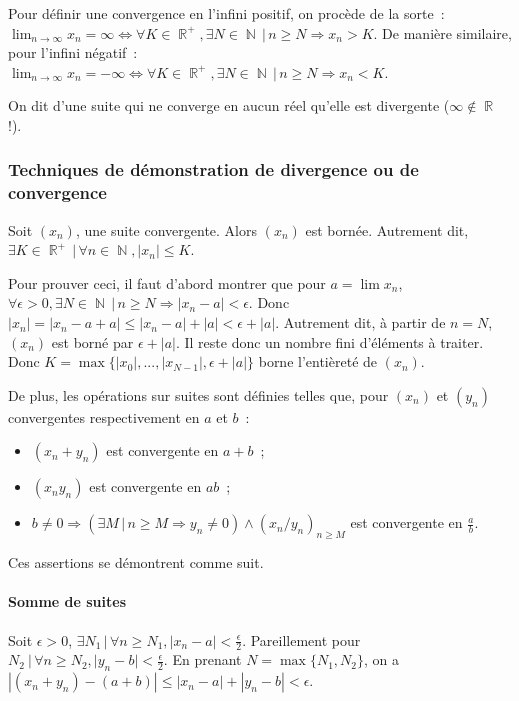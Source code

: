 \documentclass{article}
\DeclareMathOperator{\N}{\mathbb N}
\DeclareMathOperator{\R}{\mathbb R}
\theoremstyle{definition}
\theoremstyle{remark}
\begin{document}
		Pour définir une convergence en l'infini positif, on procède de la sorte~: $\lim_{n\to\infty} x_n = \infty \iff \forall K \in \R^+, \exists N \in \N \, | \, n \geq N \Rightarrow x_n > K$.
		De manière similaire, pour l'infini négatif~: $\lim_{n\to\infty}x_n = -\infty \iff \forall K \in \R^+, \exists N \in \N \, | \, n \geq N \Rightarrow x_n < K$.

		On dit d'une suite qui ne converge en aucun réel qu'elle est divergente ($\infty \not \in \R$ !).

		\subsubsection{Techniques de démonstration de divergence ou de convergence}
			Soit $(x_n)$, une suite convergente. Alors $(x_n)$ est bornée. Autrement dit, $\exists K \in \R^+ \, | \, \forall n \in \N, |x_n| \leq K$.

			Pour prouver ceci, il faut d'abord montrer que pour $a = \lim x_n$, $\forall \epsilon > 0, \exists N \in \N \, | \, n \geq N \Rightarrow |x_n - a| < \epsilon$.
			Donc $|x_n| = |x_n - a + a| \leq |x_n - a| + |a| < \epsilon + |a|$. Autrement dit, à partir de $n = N$, $(x_n)$ est borné par $\epsilon + |a|$.
			Il reste donc un nombre fini d'éléments à traiter. Donc $K = \max \{|x_0|, ..., |x_{N-1}|, \epsilon + |a|\}$ borne l'entièreté de $(x_n)$.

			De plus, les opérations sur suites sont définies telles que, pour $(x_n)$ et $(y_n)$ convergentes respectivement en $a$ et $b$~:

			\begin{itemize}
				\item $(x_n + y_n)$ est convergente en $a + b$~;
				\item $(x_ny_n)$ est convergente en $ab$~;
				\item $b \neq 0 \Rightarrow (\exists M \, | \, n \geq M \Rightarrow y_n \neq 0) \land (x_n/y_n)_{n \geq M}$ est convergente en $\frac ab$.
			\end{itemize}

			Ces assertions se démontrent comme suit.

			\paragraph{Somme de suites} Soit $\epsilon > 0$, $\exists N_1 \, | \, \forall n \geq N_1, |x_n - a| < \frac \epsilon2$. Pareillement pour
			$N_2 \ | \, \forall n \geq N_2, |y_n - b| < \frac \epsilon2$. En prenant $N = \max \{N_1, N_2\}$, on a $|(x_n + y_n) - (a + b)| \leq |x_n - a| + |y_n - b| < \epsilon$.
\end{document}
